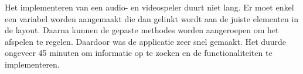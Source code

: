 Het implementeren van een audio- en videospeler duurt niet lang.
Er moet enkel een variabel worden aangemaakt die dan gelinkt wordt aan de juiste elementen
in de layout. Daarna kunnen de gepaste methodes worden aangeroepen om het afspelen te regelen. 
Daardoor was de applicatie zeer snel gemaakt. Het duurde ongeveer 45 minuten 
om informatie op te zoeken en de functionaliteiten te implementeren.


